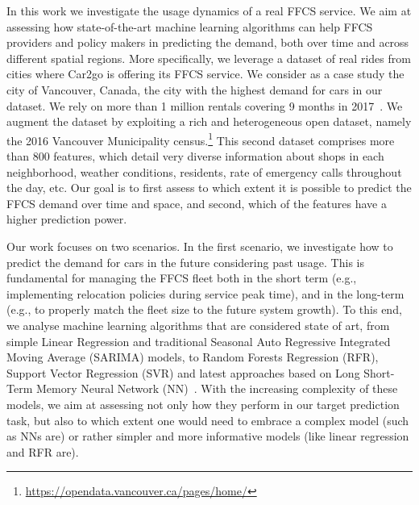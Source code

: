 In this work we investigate the usage dynamics of a real FFCS service. We aim at assessing how state-of-the-art machine learning algorithms can help FFCS providers and policy makers in predicting the demand, both over time and across different spatial regions.
More specifically, we leverage a dataset of real rides from cities where Car2go is offering its FFCS service. We consider as a case study the city of Vancouver, Canada, the city with the highest demand for cars in our dataset. We rely on more than 1 million rentals covering 9 months in 2017~\citep{UMAP}.
We augment the dataset by exploiting a rich and heterogeneous open dataset, namely the 2016 Vancouver Municipality census.\footnote{\url{https://opendata.vancouver.ca/pages/home/}} 
This second dataset comprises more than 800 features, which detail very diverse information about shops in each neighborhood, weather conditions, residents, rate of emergency calls throughout the day, etc. Our goal is to first assess to which extent it is possible to predict the FFCS demand over time and space, and second, which of the features have a higher prediction power.

Our work focuses on two scenarios.
In the first scenario, we investigate how to predict the demand for cars in the future considering past usage.  This is fundamental for managing the FFCS fleet both in the short term (e.g., implementing relocation policies during service peak time), and in the long-term (e.g., to properly match the fleet size to the future system growth).
To this end, we analyse machine learning algorithms that are considered state of art, from simple Linear Regression and traditional Seasonal Auto Regressive Integrated Moving Average (SARIMA) models, to Random Forests Regression (RFR), Support Vector Regression (SVR) and latest approaches based on Long Short-Term Memory Neural Network (NN)~\citep{brockwell2016introduction,Bishop:2006}. With the increasing complexity of these models, we aim at assessing not only how they perform in our target prediction task, but also to which extent one would need to embrace a complex model (such as NNs are) or rather simpler and more informative models (like linear regression and RFR are).


